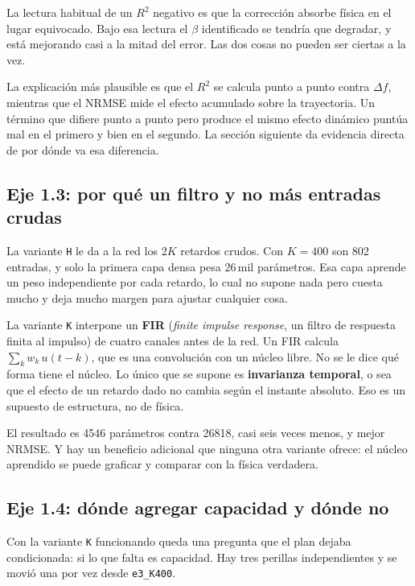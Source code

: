 \documentclass[11pt,a4paper]{article}
\newcommand{\term}[1]{\textbf{#1}}
\begin{document}
La lectura habitual de un $R^2$ negativo es que la corrección absorbe física en
el lugar equivocado. Bajo esa lectura el $\beta$ identificado se tendría que
degradar, y está mejorando casi a la mitad del error. Las dos cosas no pueden
ser ciertas a la vez.

La explicación más plausible es que el $R^2$ se calcula punto a punto contra
$\Delta f$, mientras que el NRMSE mide el efecto acumulado sobre la trayectoria.
Un término que difiere punto a punto pero produce el mismo efecto dinámico
puntúa mal en el primero y bien en el segundo. La sección siguiente da evidencia
directa de por dónde va esa diferencia.

\subsection{Eje 1.3: por qué un filtro y no más entradas crudas}

La variante \texttt{H} le da a la red los $2K$ retardos crudos. Con $K=400$ son
802 entradas, y solo la primera capa densa pesa 26\,mil parámetros. Esa capa
aprende un peso independiente por cada retardo, lo cual no supone nada pero
cuesta mucho y deja mucho margen para ajustar cualquier cosa.

La variante \texttt{K} interpone un \term{FIR} (\emph{finite impulse response},
un filtro de respuesta finita al impulso) de cuatro canales antes de la red. Un
FIR calcula $\sum_k w_k\,u(t-k)$, que es una convolución con un núcleo libre.
No se le dice qué forma tiene el núcleo. Lo único que se supone es
\term{invarianza temporal}, o sea que el efecto de un retardo dado no cambia
según el instante absoluto. Eso es un supuesto de estructura, no de física.

El resultado es 4546 parámetros contra 26818, casi seis veces menos, y mejor
NRMSE. Y hay un beneficio adicional que ninguna otra variante ofrece: el núcleo
aprendido se puede graficar y comparar con la física verdadera.

\subsection{Eje 1.4: dónde agregar capacidad y dónde no}

Con la variante \texttt{K} funcionando queda una pregunta que el plan dejaba
condicionada: si lo que falta es capacidad. Hay tres perillas independientes y
se movió una por vez desde \texttt{e3\_K400}.
\end{document}
